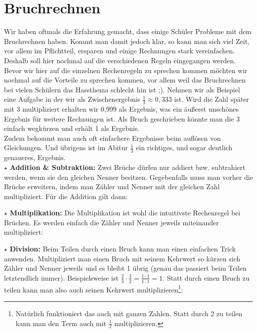 \section{Bruchrechnen}
	Wir haben oftmals die Erfahrung gemacht, dass einige Schüler Probleme mit dem
	Bruchrechnen haben. Kommt man damit jedoch klar, so kann man sich viel Zeit,
	vor allem im Pflichtteil, ersparen und einige Rechnungen stark vereinfachen.
	Deshalb soll hier nochmal auf die verschiedenen Regeln eingegangen werden.\\
	Bevor wir hier auf die einzelnen Rechenregeln zu sprechen kommen möchten wir
	nochmal auf die Vorteile zu sprechen kommen, vor allem weil das Bruchrechnen
	bei vielen Schülern das Hassthema schlecht hin ist ;). Nehmen wir als Beispiel
	eine Aufgabe in der wir als Zwischenergebnis \(\frac{1}{3}\approx 0,333\)
	ist. Wird die Zahl später mit 3 multipliziert erhalten wir 0,999 als Ergebnis,
	was ein äußerst unschönes Ergebnis für weitere Rechnungen ist. Als Bruch
	geschrieben könnte man die 3 einfach wegkürzen und erhält 1 als Ergebnis.\\
	Zudem bekommt man auch oft einfachere Ergebnisse beim auflösen von Gleichungen.
	Und übrigens ist im Abitur \(\frac{1}{3}\) ein richtiges, und sogar deutlich
	genaueres, Ergebnis.\\
	
	\(\star\) \textbf{Addition \& Subtraktion: } Zwei Brüche dürfen nur addiert
	bzw. subtrahiert werden, wenn sie den gleichen Nenner besitzen. Gegebenfalls
	muss man vorher die Brüche erweitern, indem man Zähler und Nenner mit der
	gleichen Zahl multipliziert. Für die Addition gilt dann:
	\formel{\[\frac{a}{c}\pm\frac{b}{c}=\frac{a\pm b}{c}\]}
	
	\(\star\) \textbf{Multiplikation: } Die Multiplikation ist wohl die intuitivste
	Rechenregel bei Brüchen. Es werden einfach die Zähler und Nenner
	jeweils miteinander multipliziert:
	\formel{\[ \frac{a}{b} \cdot \frac{c}{d} = \frac{a\cdot c}{b\cdot c} \]}
	
	\(\star\) \textbf{Division: } Beim Teilen durch einen Bruch kann man einen
	einfachen Trick anwenden. Multipliziert man einen Bruch mit seinem Kehrwert so
	kürzen sich Zähler und Nenner jeweils und es bleibt 1 übrig (genau das
	passiert beim Teilen letztendlich immer). Beispielsweise ist
	\(\frac{2}{3}\cdot\frac{3}{2}=\frac{1\cdot 1}{1\cdot 1}=1\). Statt durch einen
	Bruch zu teilen kann man also auch seinen Kehrwert
	multiplizieren\footnote{Natürlich funktioniert das auch mit ganzen Zahlen.
	Statt durch 2 zu teilen kann man den Term auch mit \(\frac{1}{2}\)
	multiplizieren.}:
	\( \) %
	\formel{ \[ \frac{a}{b} : \frac{c}{d} = \frac{a}{b} \cdot \frac{d}{c} \] }
	
